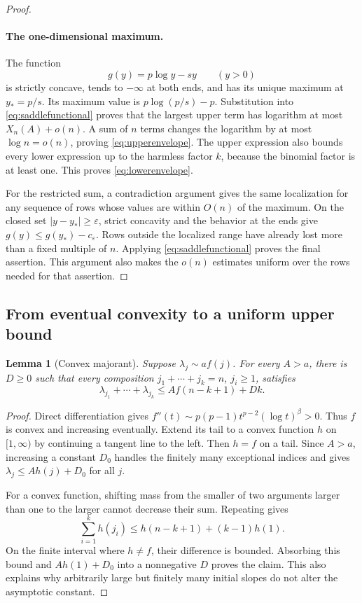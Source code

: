 \documentclass[11pt,a4paper]{article}
\numberwithin{equation}{section}
\newtheorem{lemma}[theorem]{Lemma}
\theoremstyle{definition}
\theoremstyle{remark}
\begin{document}
\begin{proof}
\paragraph{The one-dimensional maximum.}
The function
\[
 g(y)=p\log y-sy\qquad(y>0)
\]
is strictly concave, tends to $-\infty$ at both ends, and has its unique
maximum at $y_*=p/s$.  Its maximum value is $p\log(p/s)-p$.
Substitution into \eqref{eq:saddlefunctional} proves that the largest
upper term has logarithm at most $X_n(A)+o(n)$.  A sum of $n$ terms changes
the logarithm by at most $\log n=o(n)$, proving
\eqref{eq:upperenvelope}.  The upper expression also bounds every lower
expression up to the harmless factor $k$, because the binomial factor is
at least one.  This proves \eqref{eq:lowerenvelope}.

For the restricted sum, a contradiction argument gives the same
localization for any sequence of rows whose values are within $O(n)$ of
the maximum.  On the closed set $|y-y_*|\ge\varepsilon$, strict concavity
and the behavior at the ends give
$g(y)\le g(y_*)-c_\varepsilon$.  Rows outside the localized range have
already lost more than a fixed multiple of $n$.  Applying
\eqref{eq:saddlefunctional} proves the final assertion.  This argument also
makes the $o(n)$ estimates uniform over the rows needed for that assertion.
\end{proof}

\subsection{From eventual convexity to a uniform upper bound}

\begin{lemma}[Convex majorant]
\label{lem:convex}
Suppose $\lambda_j\sim a f(j)$.  For every $A>a$, there is $D\ge0$ such
that every composition $j_1+\cdots+j_k=n$, $j_i\ge1$, satisfies
\begin{equation}
 \lambda_{j_1}+\cdots+\lambda_{j_k}
 \le A f(n-k+1)+Dk.
 \label{eq:convexmajorant}
\end{equation}
\end{lemma}

\begin{proof}
Direct differentiation gives
$f''(t)\sim p(p-1)t^{p-2}(\log t)^\beta>0$.
Thus $f$ is convex and increasing eventually.  Extend its tail to a convex
function $h$ on $[1,\infty)$ by continuing a tangent line to the left.
Then $h=f$ on a tail.  Since $A>a$, increasing a constant $D_0$ handles
the finitely many exceptional indices and gives
$\lambda_j\le Ah(j)+D_0$ for all $j$.

For a convex function, shifting mass from the smaller of two arguments
larger than one to the larger cannot decrease their sum.  Repeating gives
\[
 \sum_{i=1}^kh(j_i)\le h(n-k+1)+(k-1)h(1).
\]
On the finite interval where $h\ne f$, their difference is bounded.
Absorbing this bound and $Ah(1)+D_0$ into a nonnegative $D$ proves the
claim.  This also explains why arbitrarily large but finitely many initial
slopes do not alter the asymptotic constant.
\end{proof}
\end{document}
